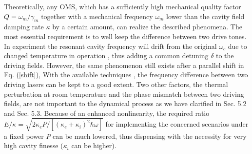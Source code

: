 \documentclass[a4paper,fleqn]{cas-dc}
\begin{document}
Theoretically, any OMS, which has a sufficiently high mechanical quality factor $Q=\omega_m/\gamma_m$ together with a mechanical frequency $\omega_m$ lower than the cavity field damping rate $\kappa$ by a certain amount, can realize the described phenomena. The most essential requirement is to well keep the difference between two drive tones. In experiment 
the resonant cavity frequency will drift from the original $\omega_c$ due to changed temperature in operation \cite{hu2021generation}, thus adding a common detuning $\delta$ to the driving fields. However, the same phenomenon still exists after a parallel shift in 
Eq. (\ref{shift}),  
With the available techniques \cite{verlot2010backaction,shen2021dissipatively}, the frequency difference between two driving lasers 
can be kept to a good extent. Two other factors, the thermal perturbation at room temperature and the phase mismatch between two driving fields, are not important to the dynamical process as we have clarified in Sec. 5.2 and Sec. 5.3. Because of an enhanced nonlinearity, the required ratio $E/\kappa=\sqrt{2\kappa_eP/[(\kappa_e+\kappa_i)^2\hbar\omega]}$ for implementing the concerned scenarios under a fixed power $P$ can be much lowered, thus dispensing with the necessity for very high cavity finesse ($\kappa_i$ can be higher).       
\end{document}
